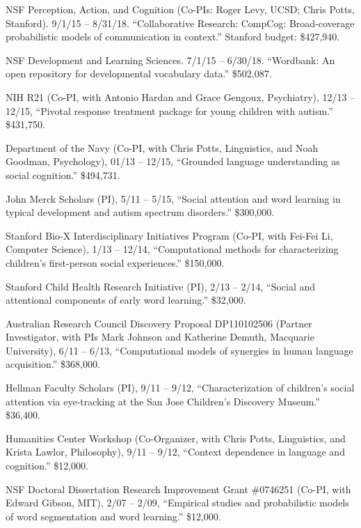 \documentclass{article}
\renewenvironment{itemize}{
\begin{list}{}{
  \setlength{\leftmargin}{1.5em}
  }
  }{
\end{list}
}
\begin{document}
\begin{itemize}
  \item NSF Perception, Action, and Cognition (Co-PIs: Roger Levy, UCSD; Chris Potts, Stanford). 9/1/15 -- 8/31/18. ``Collaborative Research: CompCog: Broad-coverage probabilistic models of communication in context.'' Stanford budget: \$427,940.

  \item NSF Development and Learning Sciences. 7/1/15 -- 6/30/18. ``Wordbank: An open repository for developmental vocabulary data.'' \$502,087.

  \item NIH R21 (Co-PI, with Antonio Hardan and Grace Gengoux, Psychiatry), 12/13 -- 12/15, ``Pivotal response treatment package for young children with autism.''  \$431,750.

  \item Department of the Navy (Co-PI, with Chris Potts, Linguistics, and Noah Goodman, Psychology), 01/13 -- 12/15, ``Grounded language understanding as social cognition.''  \$494,731.

  \item John Merck Scholars (PI), 5/11 -- 5/15, ``Social attention and word learning in typical development and autism spectrum disorders.''  \$300,000.

  \item Stanford Bio-X Interdisciplinary Initiatives Program (Co-PI, with Fei-Fei Li, Computer Science), 1/13 -- 12/14, ``Computational methods for characterizing children's first-person social experiences.''  \$150,000.

  \item Stanford Child Health Research Initiative (PI), 2/13 -- 2/14, ``Social and attentional components of early word learning.''  \$32,000.

  \item Australian Research Council Discovery Proposal DP110102506 (Partner Investigator, with PIs Mark Johnson and Katherine Demuth, Macquarie University), 6/11 -- 6/13, ``Computational models of synergies in human language acquisition.''  \$368,000.

  \item Hellman Faculty Scholars (PI), 9/11 -- 9/12, ``Characterization of children's social attention via eye-tracking at the San Jose Children's Discovery Museum.''  \$36,400.

  \item Humanities Center Workshop (Co-Organizer, with Chris Potts, Linguistics, and Krista Lawlor, Philosophy), 9/11 -- 9/12, ``Context dependence in language and cognition.''  \$12,000.

  \item NSF Doctoral Dissertation Research Improvement Grant \#0746251 (Co-PI, with Edward Gibson, MIT), 2/07 -- 2/09, ``Empirical studies and probabilistic models of word segmentation and word learning.''  \$12,000.
\end{itemize}
\end{document}
